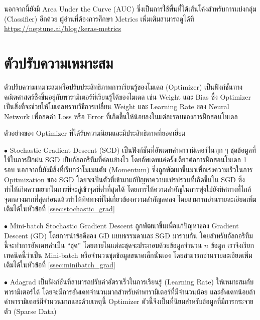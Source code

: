 นอกจากนี้ยังมี Area Under the Curve (AUC) ซึ่งเป็นการใช้พื้นที่ใต้เส้นโค้งสำหรับการแบ่งกลุ่ม (Classifier) อีกด้วย ผู้อ่านที่ต้องการศึกษา Metrics เพิ่มเติมสามารถดูได้ที่ \url{https://neptune.ai/blog/keras-metrics}

\section{ตัวปรับความเหมาะสม}
\label{sec:optimizer}

ตัวปรับความเหมาะสมหรือปรับประสิทธิภาพการเรียนรู้ของโมเดล (Optimizer) เป็นฟังก์ชันทางคณิตศาสตร์ซึ่งขึ้นอยู่กับพารามิเตอร์ที่เรียนรู้ได้ของโมเดล
เช่น Weight และ Bias ซึ่ง Optimizer เป็นสิ่งที่จะช่วยให้โมเดลทราบวิธีการเปลี่ยน Weight และ Learning Rate ของ Neural Network
เพื่อลดค่า Loss หรือ Error ที่เกิดขึ้นให้น้อยลงในแต่ละรอบของการฝึกสอนโมเดล

\noindent ตัวอย่างของ Optimizer ที่ได้รับความนิยมและมีประสิทธิภาพที่ยอดเยี่ยม

\noindent $\bullet$ Stochastic Gradient Descent (SGD) เป็นฟังก์ชันที่อัพเดทค่าพารามิเตอร์ในทุก ๆ ชุดข้อมูลที่ใช้ในการฝึกฝน SGD
เป็นอัลกอริทึมที่ค่อนข้างไว โดยอัพเดทแค่ครั้งเดียวต่อการฝึกสอนโมเดล 1 รอบ นอกจากนี้ยังมีสิ่งที่เรียกว่าโมเมนตัม (Momentum) ซึ่งถูกพัฒนาขึ้นมาเพื่อเร่งความเร็วในการ Opitmization ของ SGD โดยจะเป็นตัวที่เข้ามาแก้ปัญหาความแปรปรวนที่เกิดขึ้นใน SGD ซึ่งทำให้เกิดความยากในการที่จะลู่เข้าจุดที่ต่ำที่สุดได้ โดยการให้ความสำคัญในการพุ่งไปยังทิศทางที่ใกล้จุดกลางมากที่สุดก่อนแล้วทำให้ทิศทางที่ไม่เกี่ยวข้องความสำคัญลดลง
โดยสามารถอ่านรายละเอียดเพิ่มเติมได้ในหัวข้อที่ \ref{ssec:stochastic_grad}

\noindent $\bullet$ Mini-batch Stochastic Gradient Descent ถูกพัฒนาขึ้นเพื่อแก้ปัญหาของ Gradient Descent (GD)
โดยการนำข้อดีของ GD แบบธรรมดาและ SGD มารวมกัน โดยสำหรับอัลกอริทึมนี้จะทำการอัพเดทค่าเป็น \enquote{ชุด} โดยภายในแต่ละชุดจะประกอบด้วยข้อมูลจำนวน $n$ ข้อมูล เราจึงเรียกเทคนิคนี้ว่าเป็น Mini-batch หรือจำนวนชุดข้อมูลขนาดเล็กนั่นเอง โดยสามารถอ่านรายละเอียดเพิ่มเติมได้ในหัวข้อที่ \ref{ssec:minibatch_grad}

\noindent $\bullet$ Adagrad เป็นฟังก์ชันที่สามารถปรับค่าอัตราเร็วในการเรียนรู้ (Learning Rate) ให้เหมาะสมกับพารามิเตอร์ได้
โดยจะมีการอัพเดทจำนวนมากสำหรับค่าพารามิเตอร์ที่มีจำนวนน้อย และอัพเดทน้อยถ้าค่าพารามิเตอร์มีจำนวนมากและด้วยเหตุนี้ Optimizer
ตัวนี้จึงเป็นที่นิยมสำหรับข้อมูลที่มีการกระจายตัว (Sparse Data)

